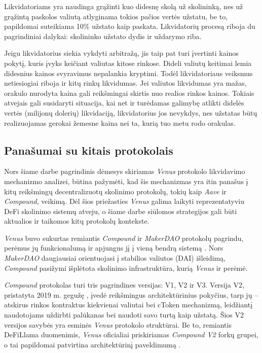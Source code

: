 \documentclass[]{VUMIFTemplateClass}
\begin{document}
Likvidatoriams yra naudinga grąžinti kuo didesnę skolą už skolininką, nes už grąžintą paskolos valiutą atlyginama tokios pačios vertės užstatu, be to, papildomai suteikiama 10\% užstato kaip paskata. Likvidatorių procesą riboja du pagrindiniai dalykai: skolininko užstato dydis ir uždarymo riba.

Jeigu likvidatorius siekia vykdyti arbitražą, jis taip pat turi įvertinti kainos pokytį, kuris įvyks keičiant valiutas kitose rinkose. Dideli valiutų keitimai lemia didesnius kainos svyravimus nepalankia kryptimi. Todėl likvidatoriaus veiksmus netiesiogiai riboja ir kitų rinkų likvidumas. Jei valiutos likvidumas yra mažas, orakulo nurodyta kaina gali reikšmingai skirtis nuo realios rinkos kainos. Tokiais atvejais gali susidaryti situacija, kai net ir turėdamas galimybę atlikti didelės vertės (milijonų dolerių) likvidaciją, likvidatorius jos nevykdys, nes užstatas būtų realizuojamas gerokai žemesne kaina nei ta, kurią tuo metu rodo orakulas. 

\subsection{Panašumai su kitais protokolais}
\label{sec:panasumai_su_kitais_protokolais}

Nors šiame darbe pagrindinis dėmesys skiriamas \textit{Venus} protokolo likvidavimo mechanizmo analizei, būtina pažymėti, kad šis mechanizmas yra itin panašus į kitų reikšmingų decentralizuotų skolinimo protokolų, tokių kaip \textit{Aave} ir \textit{Compound}, veikimą. Dėl šios priežasties \textit{Venus} galima laikyti reprezentatyviu DeFi skolinimo sistemų atveju, o šiame darbe siūlomos strategijos gali būti aktualios ir taikomos kitų protokolų kontekste.

\textit{Venus} buvo sukurtas remiantis \textit{Compound} ir \textit{MakerDAO} protokolų pagrindu, perėmus jų funkcionalumą ir apjungus jį į vieną bendrą sistemą \cite{whatisvenus}. Nors \textit{MakerDAO} daugiausiai orientuojasi į stabilios valiutos (DAI) išleidimą, \textit{Compound} pasižymi išplėtota skolinimo infrastruktūra, kurią \textit{Venus} ir perėmė.

\textit{Compound} protokolas turi tris pagrindines versijas: V1, V2 ir V3. Versija V2, pristatyta 2019 m. gegužę \cite{compound2launch}, įvedė reikšmingus architektūrinius pokyčius, tarp jų – atskirus rinkos kontraktus kiekvienai valiutai bei cToken mechanizmą, leidžiantį naudotojams uždirbti palūkanas bei naudoti savo turtą kaip užstatą. Šios V2 versijos savybės yra esminės \textit{Venus} protokolo struktūrai. Be to, remiantis DeFiLlama duomenimis, \textit{Venus} oficialiai priskiriamas \textit{Compound V2} forkų grupei, o tai papildomai patvirtina architektūrinį paveldimumą \cite{venuscompoundfork}.
\end{document}
